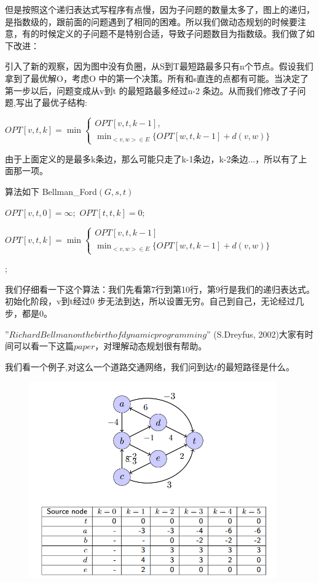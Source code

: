 但是按照这个递归表达式写程序有点慢，因为子问题的数量太多了，图上的递归，是指数级的，跟前面的问题遇到了相同的困难。所以我们做动态规划的时候要注意，有的时候定义的子问题不是特别合适，导致子问题数目为指数级。我们做了如下改进：

引入了新的观察，因为图中没有负圈，从S到T最短路最多只有n个节点。假设我们拿到了最优解O，考虑O 中的第一个决策。所有和s直连的点都有可能。当决定了第一步以后，问题变成从v到t 的最短路最多经过n-2 条边。从而我们修改了子问题,写出了最优子结构:

 \begin{small} $OPT[v, t,  k] = \min \begin{cases}
		OPT[ v, t,  k-1 ], \\
		\min_{<v,w>\in E} \{OPT[ w, t,  k-1 ] + d(v, w) \}
		\end{cases}$
		\end{small}

由于上面定义的是最多k条边，那么可能只走了k-1条边，k-2条边$...$，所以有了上面那一项。


算法如下
\sc Bellman\_Ford$( G, s, t )$
\begin{algorithmic}[1]
\STATE $OPT[v, t, 0] = \infty;$
\ENDFOR
{}
\STATE $OPT[t, t, k] = 0;$
\ENDFOR
{}
\STATE \begin{small} $OPT[v, t, k] = \min \begin{cases}
		OPT[v, t, k-1 ]\\
		\min_{<v,w>\in E} \{OPT[w, t,  k-1 ] + d(v,w) \}
		\end{cases}$
		\end{small}
\ENDFOR
\ENDFOR
{};
\end{algorithmic}
我们仔细看一下这个算法：我们先看第7行到第10行，第9行是我们的递归表达式。初始化阶段，v到t经过0 步无法到达，所以设置无穷。自己到自己，无论经过几步，都是0。

”$Richard Bellman on the birth of dynamic programming$” (S.Dreyfus, 2002)大家有时间可以看一下这篇$paper$，对理解动态规划很有帮助。

我们看一个例子,对这么一个道路交通网络，我们问到达$t$的最短路径是什么。
\begin{figure}[H]
\centering
\includegraphics[width=4.2in]{example.png}
\end{figure}

